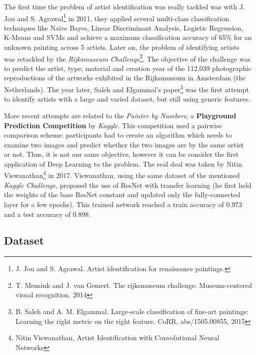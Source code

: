 The first time the problem of artist identification was really tackled was with J. Jou and S. Agrawal\footnote{J. Jou and S. Agrawal. Artist identification for renaissance paintings.} in 2011, they applied several multi-class classification techniques like Naïve Bayes, Linear Discriminant Analysis, Logistic Regression, K-Means and SVMs and achieve a maximum classification accuracy of 65\% for an unknown painting across 5 artists. 
Later on, the problem of identifying artists was retackled by the \textit{Rijksmuseum Challenge}\footnote{T. Mensink and J. van Gemert. The rijksmuseum challenge: Museum-centered visual recognition. 2014}. The objective of the challenge was to predict the artist, type, material and creation year of the 112,039 photographic reproductions of the artworks exhibited in the Rijksmuseum in Amsterdam (the Netherlands). The year later, Saleh and Elgammal's paper\footnote{B. Saleh and A. M. Elgammal. Large-scale classification of fine-art paintings: Learning the right metric on the right
feature. CoRR, abs/1505.00855, 2015} was the first attempt to identify artists with a large and varied dataset, but still using generic features.

More recent attempts are related to the \textit{Painter by Numbers}, a \textbf{Playground Prediction Competition} by \textit{Kaggle}. This competition used a pairwise comparison scheme: participants had to create an algorithm which needs to examine two images and predict whether the two images are by the same artist or not. Thus, it is not our same objective, however it can be consider the first application of Deep Learning to the problem. The real deal was taken by Nitin Viswanathan\footnote{Nitin Viswanathan, Artist Identification with Convolutional Neural Networks} in 2017.
Viswanathan, using the same dataset of the mentioned \textit{Kaggle Challenge}, proposed the use of ResNet with transfer learning (he first held the weights of the base ResNet constant and updated only the fully-connected layer for a few epochs). This trained network reached a train accuracy of 0.973 and a test accuracy of 0.898.



\subsection{Dataset}